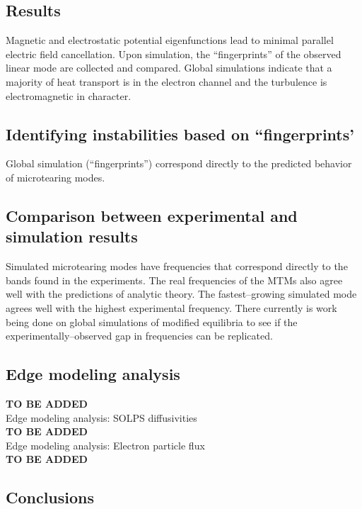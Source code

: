 \documentclass[a4paper,openany,12pt]{book}
\begin{document}
\subsection*{Results}

Magnetic and electrostatic potential eigenfunctions lead to minimal parallel electric field cancellation. Upon simulation, the ``fingerprints'' of the observed linear mode are collected and compared. Global simulations indicate that a majority of heat transport is in the electron channel and the turbulence is electromagnetic in character.

\subsection{Identifying instabilities based on ``fingerprints'}

Global simulation (``fingerprints'') correspond directly to the predicted behavior of microtearing modes.

\subsection{Comparison between experimental and simulation results}

Simulated microtearing modes have frequencies that correspond directly to the bands found in the experiments. The real frequencies of the MTMs also agree well with the predictions of analytic theory. The fastest--growing simulated mode agrees well with the highest experimental frequency. There currently is work being done on global simulations of modified equilibria to see if the experimentally--observed gap in frequencies can be replicated.

\subsection{Edge modeling analysis}

\textbf{TO BE ADDED}\\

\noindent Edge modeling analysis: SOLPS diffusivities\\

\textbf{TO BE ADDED}\\

\noindent Edge modeling analysis: Electron particle flux\\

\textbf{TO BE ADDED}

\subsection{Conclusions}
\end{document}
